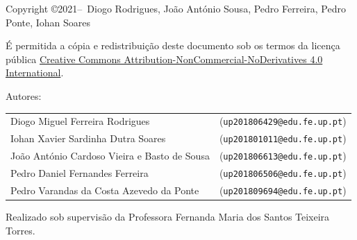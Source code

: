 \documentclass[11pt, a4paper, oneside]{book}
\makeatletter
\newcommand{\email}[1]{\texttt{#1}}
\def\printdate{{\@date}}
\newenvironment{secondpage}{
    \clearpage\null\vfill
    \thispagestyle{empty}
    \begin{minipage}[b]{0.9\textwidth}
        \footnotesize\raggedright
        \setlength{\parskip}{0.5\baselineskip}
}{
    \end{minipage}
    \vspace*{2\baselineskip}
}
\makeatother
\begin{document}
\begin{titlepage}
\end{titlepage}
\pagecolor{white}
        
\begin{secondpage}
    Copyright \copyright 2021--\the\year\ Diogo Rodrigues, João António Sousa, Pedro Ferreira, Pedro Ponte, Iohan Soares\par
    É permitida a cópia e redistribuição deste documento sob os termos da licença pública
    \href{https://creativecommons.org/licenses/by-nc-nd/4.0/}{Creative Commons Attribution-NonCommercial-NoDerivatives 4.0 International}.\par
    
    \vspace{2em}
    
    Autores: \par
    \begin{tabular}{@{} l l @{}}
        Diogo Miguel Ferreira Rodrigues & (\email{up201806429@edu.fe.up.pt}) \\
        Iohan Xavier Sardinha Dutra Soares & (\email{up201801011@edu.fe.up.pt}) \\
        João António Cardoso Vieira e Basto de Sousa & (\email{up201806613@edu.fe.up.pt}) \\
        Pedro Daniel Fernandes Ferreira & (\email{up201806506@edu.fe.up.pt}) \\
        Pedro Varandas da Costa Azevedo da Ponte & (\email{up201809694@edu.fe.up.pt})
    \end{tabular}\par
    
    \vspace{2em}

    Realizado sob supervisão da Professora Fernanda Maria dos Santos Teixeira Torres.
\end{secondpage}
\end{document}
